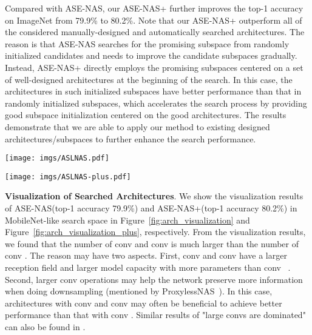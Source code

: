 \documentclass[lettersize,journal]{IEEEtran}
\newcommand{\sexyname}{ASE-NAS\xspace}
\newcommand{\sexynameplus}{ASE-NAS+\xspace}
\begin{document}
Compared with \sexyname, our \sexynameplus further improves the top-1 accuracy on ImageNet from 79.9\% to 80.2\%.
Note that our \sexynameplus outperform all of the considered manually-designed and automatically searched architectures.
The reason is that \sexyname searches for the promising subspace from randomly initialized candidates and needs to improve the candidate subspaces gradually.
Instead, \sexynameplus directly employs the promising subspaces centered on a set of well-designed architectures at the beginning of the search.
In this case, the architectures in such initialized subspaces have better performance than that in randomly initialized subspaces, which accelerates the search process by providing good subspace initialization centered on the good architectures.
The results demonstrate that we are able to apply our method to existing designed architectures/subspaces to further enhance the search performance.

\begin{figure*}[t]
\centering
\texttt{[image: imgs/ASLNAS.pdf]}
\caption{
    The architecture searched by \sexyname in MobileNet-like search space.
}
\label{fig:arch_visualization}
\end{figure*}

\begin{figure*}[t]
\centering
\texttt{[image: imgs/ASLNAS-plus.pdf]}
\caption{
    The architecture searched by \sexynameplus in MobileNet-like search space.
}
\label{fig:arch_visualization_plus}
\end{figure*}

\textbf{Visualization of Searched Architectures}.
We show the visualization results of \sexyname (top-1 accuracy 79.9\%) and \sexynameplus (top-1 accuracy 80.2\%) in MobileNet-like search space in Figure~\ref{fig:arch_visualization} and Figure~\ref{fig:arch_visualization_plus}, respectively.
From the visualization results, we found that
the number of conv  and conv  is much larger than the number of conv .
The reason may have two aspects. 
First, conv  and conv  have a larger reception field and larger model capacity with more parameters than conv ~\cite{tan2019mixconv}. Second, larger conv operations may help the network preserve more information when doing downsampling (mentioned by ProxylessNAS~\cite{cai2018proxylessnas}).
In this case, architectures with conv  and conv  may often be beneficial to achieve better performance than that with conv .
Similar results of "large convs are dominated" can also be found in \cite{Cai2020Once,cai2018proxylessnas}.
\end{document}

